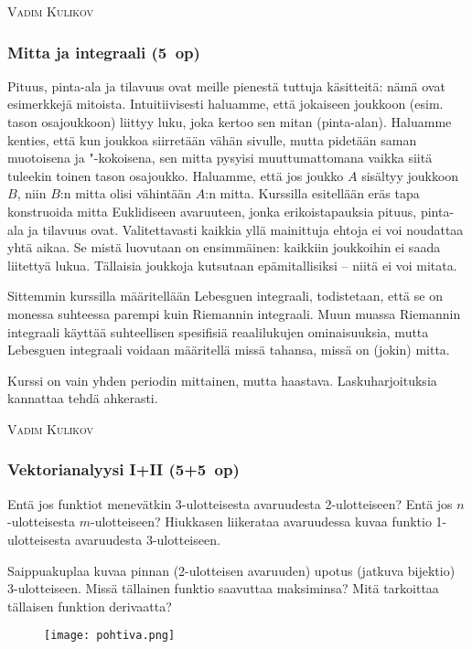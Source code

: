 \documentclass[../ala_hataile.tex]{subfiles}
\begin{document}
	\vspace{0.5cm}
	\noindent\textsc{Vadim Kulikov}
	
	\subsubsection*{Mitta ja integraali (5~op)}
	Pituus, pinta-ala ja tilavuus ovat meille
	pienestä tuttuja käsitteitä: nämä ovat esimerkkejä
	mitoista. Intuitiivisesti haluamme,
	että jokaiseen joukkoon (esim. tason
	osajoukkoon) liittyy luku, joka kertoo sen
	mitan (pinta-alan). Haluamme kenties, että
	kun joukkoa siirretään vähän sivulle, mutta
	pidetään saman muotoisena ja "-kokoisena,
	sen mitta pysyisi muuttumattomana vaikka
	siitä tuleekin toinen tason osajoukko. Haluamme,
	että jos joukko $A$ sisältyy joukkoon
	$B$, niin $B$:n mitta olisi vähintään $A$:n mitta.
	Kurssilla esitellään eräs tapa konstruoida
	mitta Euklidiseen avaruuteen, jonka erikoistapauksia
	pituus, pinta-ala ja tilavuus
	ovat. Valitettavasti kaikkia yllä mainittuja
	ehtoja ei voi noudattaa yhtä aikaa. Se mistä
	luovutaan on ensimmäinen: kaikkiin joukkoihin
	ei saada liitettyä lukua. Tällaisia
	joukkoja kutsutaan epämitallisiksi -- niitä
	ei voi mitata.
	
	Sittemmin kurssilla määritellään Lebesguen
	integraali, todistetaan, että se on monessa
	suhteessa parempi kuin Riemannin
	integraali. Muun muassa Riemannin integraali
	käyttää suhteellisen spesifisiä reaalilukujen
	ominaisuuksia, mutta Lebesguen integraali
	voidaan määritellä missä tahansa,
	missä on (jokin) mitta.
	
	Kurssi on vain yhden periodin mittainen,
	mutta haastava. Laskuharjoituksia
	kannattaa tehdä ahkerasti.
	
	\vspace{0.5cm}
	\noindent\textsc{Vadim Kulikov}
	\subsubsection*{Vektorianalyysi I+II (5+5~op)}
	Entä jos funktiot menevätkin 3-ulotteisesta
	avaruudesta 2-ulotteiseen? Entä
	jos $n$-ulotteisesta $m$-ulotteiseen? Hiukkasen
	liike\-rataa avaruudessa kuvaa funktio 1-ulotteisesta avaruudesta 3-ulotteiseen.
	
	Saippuakuplaa kuvaa pinnan (2-ulotteisen
	avaruuden) upotus (jatkuva bijektio)
	3-ulotteiseen. Missä tällainen funktio saavuttaa
	maksiminsa? Mitä tarkoittaa tällaisen
	funktion derivaatta?
	\begin{figure}[!b]
		\centering
		\texttt{[image: pohtiva.png]}
	\end{figure}
	
\end{document}
